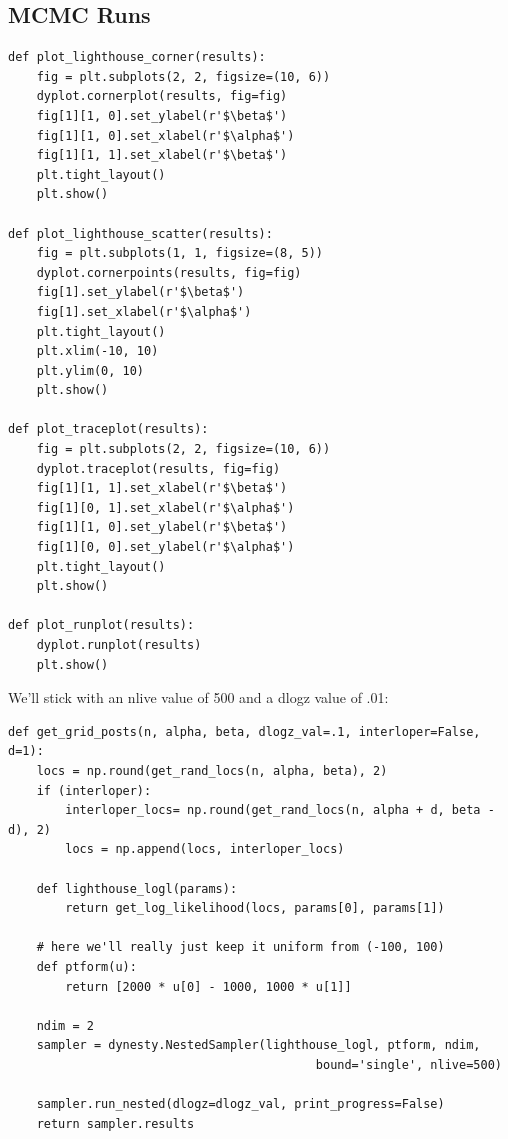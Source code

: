 \documentclass[11pt]{article}
\begin{document}
\subsection*{MCMC Runs}
\label{sec-2-2}

\begin{verbatim}
def plot_lighthouse_corner(results):
    fig = plt.subplots(2, 2, figsize=(10, 6))
    dyplot.cornerplot(results, fig=fig)
    fig[1][1, 0].set_ylabel(r'$\beta$')
    fig[1][1, 0].set_xlabel(r'$\alpha$')
    fig[1][1, 1].set_xlabel(r'$\beta$')
    plt.tight_layout()
    plt.show()

def plot_lighthouse_scatter(results):
    fig = plt.subplots(1, 1, figsize=(8, 5))
    dyplot.cornerpoints(results, fig=fig)
    fig[1].set_ylabel(r'$\beta$')
    fig[1].set_xlabel(r'$\alpha$')
    plt.tight_layout()
    plt.xlim(-10, 10)
    plt.ylim(0, 10)
    plt.show()

def plot_traceplot(results):
    fig = plt.subplots(2, 2, figsize=(10, 6))
    dyplot.traceplot(results, fig=fig)
    fig[1][1, 1].set_xlabel(r'$\beta$')
    fig[1][0, 1].set_xlabel(r'$\alpha$')
    fig[1][1, 0].set_ylabel(r'$\beta$')
    fig[1][0, 0].set_ylabel(r'$\alpha$')
    plt.tight_layout()
    plt.show()

def plot_runplot(results):
    dyplot.runplot(results)
    plt.show()
\end{verbatim}


We'll stick with an nlive value of 500 and a dlogz value of .01:

\begin{verbatim}
def get_grid_posts(n, alpha, beta, dlogz_val=.1, interloper=False, d=1):
    locs = np.round(get_rand_locs(n, alpha, beta), 2)
    if (interloper):
        interloper_locs= np.round(get_rand_locs(n, alpha + d, beta - d), 2)
        locs = np.append(locs, interloper_locs)
    
    def lighthouse_logl(params):
        return get_log_likelihood(locs, params[0], params[1])
    
    # here we'll really just keep it uniform from (-100, 100)
    def ptform(u):
        return [2000 * u[0] - 1000, 1000 * u[1]]

    ndim = 2
    sampler = dynesty.NestedSampler(lighthouse_logl, ptform, ndim,
                                           bound='single', nlive=500) 

    sampler.run_nested(dlogz=dlogz_val, print_progress=False)
    return sampler.results
\end{verbatim}
\end{document}
